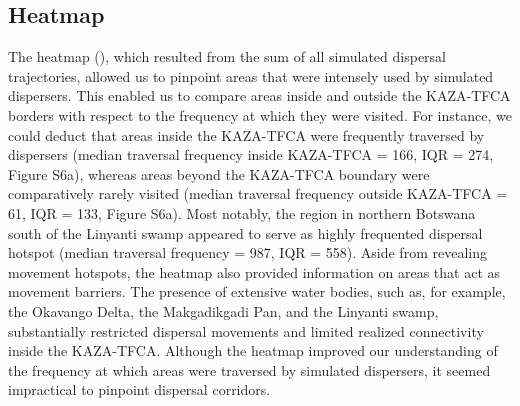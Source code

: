 \documentclass[abstract=on,10pt,a4paper,bibliography=totocnumbered]{article}
\begin{document}
\subsection{Heatmap}
The heatmap (), which resulted from the sum of all simulated
dispersal trajectories, allowed us to pinpoint areas that were intensely used by
simulated dispersers. This enabled us to compare areas inside and outside the
KAZA-TFCA borders with respect to the frequency at which they were visited. For
instance, we could deduct that areas inside the KAZA-TFCA were frequently
traversed by dispersers (median traversal frequency inside KAZA-TFCA = 166, IQR
= 274, Figure S6a), whereas areas beyond the KAZA-TFCA boundary were
comparatively rarely visited (median traversal frequency outside KAZA-TFCA = 61,
IQR = 133, Figure S6a). Most notably, the region in northern Botswana south of
the Linyanti swamp appeared to serve as highly frequented dispersal hotspot
(median traversal frequency = 987, IQR = 558). Aside from revealing movement
hotspots, the heatmap also provided information on areas that act as movement
barriers. The presence of extensive water bodies, such as, for example, the
Okavango Delta, the Makgadikgadi Pan, and the Linyanti swamp, substantially
restricted dispersal movements and limited realized connectivity inside the
KAZA-TFCA. Although the heatmap improved our understanding of the frequency at
which areas were traversed by simulated dispersers, it seemed impractical to
pinpoint dispersal corridors.
\end{document}
